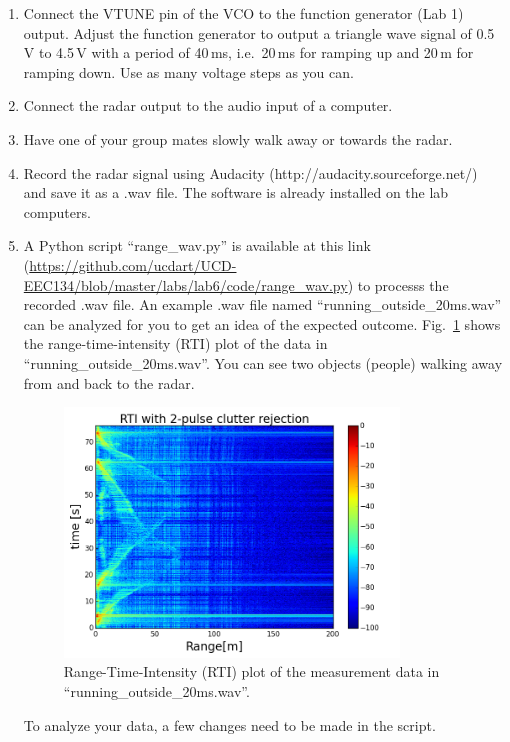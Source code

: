\documentclass[letterpaper, 11pt]{article}
\begin{document}
\begin{enumerate}
	\item Connect the VTUNE pin of the VCO to the  function generator (Lab 1) output. Adjust the  function generator to output a triangle wave signal of 0.5\,V to 4.5\,V with a period of 40\,ms, i.e.~20\,ms for ramping up and 20\,m for ramping down. Use as many voltage steps as you can. 
	
	\item Connect the radar output to the audio input of a computer. 
	
	\item Have one of your group mates slowly walk away or towards the radar. 
	
	\item Record the radar signal using Audacity (http://audacity.sourceforge.net/) and save it as a .wav file. The software is already installed on the lab computers.
	
	\item A Python script ``range\_wav.py'' is available at this link (\url{https://github.com/ucdart/UCD-EEC134/blob/master/labs/lab6/code/range_wav.py}) to processs the recorded .wav file. An example .wav file named ``running\_outside\_20ms.wav'' can be analyzed for you to get an idea of the expected outcome. Fig.~\ref{fig:rti-cr} shows the range-time-intensity (RTI) plot of the data in ``running\_outside\_20ms.wav''. You can see two objects (people) walking away from and back to the radar. 
	
	\begin{figure}[h]
		\centering
		\includegraphics[width=3.5in]{rti-cr.png}
		\caption{Range-Time-Intensity (RTI) plot of the measurement data in ``running\_outside\_20ms.wav''.}
		\label{fig:rti-cr}
	\end{figure} 	
	
	
	To analyze your data, a few changes need to be made in the script.
	

\end{enumerate}
\end{document}
